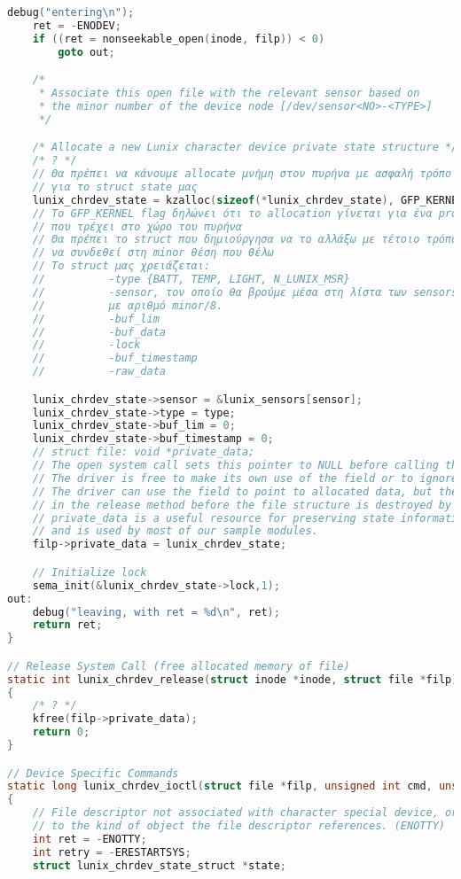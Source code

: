 \documentclass{article}
\begin{document}
\begin{lstlisting}[language=C,basicstyle=\tiny]
	debug("entering\n");
	ret = -ENODEV;
	if ((ret = nonseekable_open(inode, filp)) < 0)
		goto out;

	/*
	 * Associate this open file with the relevant sensor based on
	 * the minor number of the device node [/dev/sensor<NO>-<TYPE>]
	 */

	/* Allocate a new Lunix character device private state structure */
	/* ? */
	// Θα πρέπει να κάνουμε allocate μνήμη στον πυρήνα με ασφαλή τρόπο
	// για το struct state μας
	lunix_chrdev_state = kzalloc(sizeof(*lunix_chrdev_state), GFP_KERNEL);
	// Το GFP_KERNEL flag δηλώνει ότι το allocation γίνεται για ένα process
	// που τρέχει στο χώρο του πυρήνα
	// Θα πρέπει το struct που δημιούργησα να το αλλάξω με τέτοιο τρόπο ώστε
	// να συνδεθεί στη minor θέση που θέλω 
	// Το struct μας χρειάζεται:
	//          -type {BATT, TEMP, LIGHT, N_LUNIX_MSR}
	//          -sensor, τον οποίο θα βρούμε μέσα στη λίστα των sensors
	//          με αριθμό minor/8.
	//          -buf_lim
	//          -buf_data
	//          -lock
	//          -buf_timestamp
	//          -raw_data

	lunix_chrdev_state->sensor = &lunix_sensors[sensor];
	lunix_chrdev_state->type = type;
	lunix_chrdev_state->buf_lim = 0;
	lunix_chrdev_state->buf_timestamp = 0;
	// struct file: void *private_data;
	// The open system call sets this pointer to NULL before calling the open method for the driver.
	// The driver is free to make its own use of the field or to ignore it.
	// The driver can use the field to point to allocated data, but then must free memory 
	// in the release method before the file structure is destroyed by the kernel.
	// private_data is a useful resource for preserving state information across system calls
	// and is used by most of our sample modules.
	filp->private_data = lunix_chrdev_state;

	// Initialize lock
	sema_init(&lunix_chrdev_state->lock,1);
out:
	debug("leaving, with ret = %d\n", ret);
	return ret;
}

// Release System Call (free allocated memory of file)
static int lunix_chrdev_release(struct inode *inode, struct file *filp)
{
	/* ? */
	kfree(filp->private_data);
	return 0;
}

// Device Specific Commands
static long lunix_chrdev_ioctl(struct file *filp, unsigned int cmd, unsigned long arg)
{
	// File descriptor not associated with character special device, or the request does not apply
	// to the kind of object the file descriptor references. (ENOTTY)
	int ret = -ENOTTY;
	int retry = -ERESTARTSYS;
	struct lunix_chrdev_state_struct *state;


\end{lstlisting}
\end{document}
